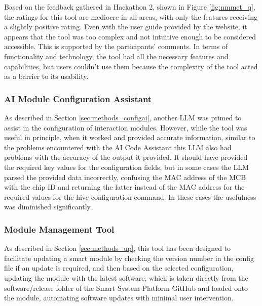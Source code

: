 Based on the feedback gathered in Hackathon 2, shown in Figure \ref{fig:nmmct_q}, the ratings for this tool are mediocre in all areas, with only the features receiving a slightly positive rating. Even with the user guide provided by the website, it appears that the tool was too complex and not intuitive enough to be considered accessible. This is supported by the participants' comments. In terms of functionality and technology, the tool had all the necessary features and capabilities, but users couldn't use them because the complexity of the tool acted as a barrier to its usability.

\subsubsection{\label{sec:res_ai_config}AI Module Configuration Assistant}

As described in Section \ref{sec:methods_configai}, another LLM was primed to assist in the configuration of interaction modules. However, while the tool was useful in principle, when it worked and provided accurate information, similar to the problems encountered with the AI Code Assistant this LLM also had problems with the accuracy of the output it provided. It should have provided the required key values for the configuration fields, but in some cases the LLM parsed the provided data incorrectly, confusing the MAC address of the MCB with the chip ID and returning the latter instead of the MAC address for the required values for the hive configuration command. In these cases the usefulness was diminished significantly.

\subsubsection{\label{sec:res_mmt}Module Management Tool}

As described in Section \ref{sec:methods_up}, this tool has been designed to facilitate updating a smart module by checking the version number in the config file if an update is required, and then based on the selected configuration, updating the module with the latest software, which is taken directly from the software/release folder of the Smart System Platform GitHub and loaded onto the module, automating software updates with minimal user intervention.


